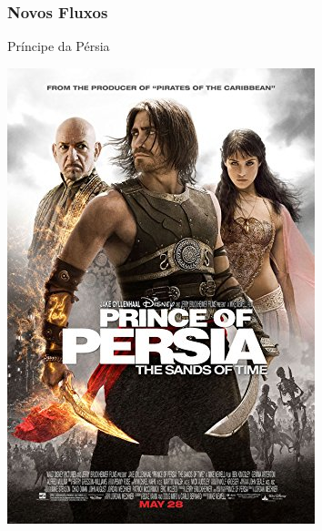 \begin{frame}
    \frametitle{Novos Fluxos}
    
    \alert{Príncipe da Pérsia}

    \includegraphics[height=0.8\textheight]{img/posters/pop.jpg}
\end{frame}

